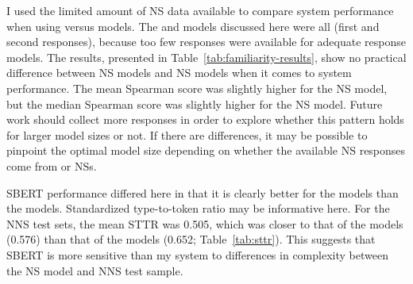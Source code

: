 I used the limited amount of  NS data available to compare system performance when using  versus  models. The  and  models discussed here were all  (first and second responses), because too few  responses were available for adequate  response models. The results, presented in Table~\ref{tab:familiarity-results}, show no practical difference between  NS models and  NS models when it comes to system performance. The mean Spearman score was slightly higher for the  NS model, but the median Spearman score was slightly higher for the  NS model. Future work should collect more  responses in order to explore whether this pattern holds for larger model sizes or not. If there are differences, it may be possible to pinpoint the optimal model size depending on whether the available NS responses come from  or  NSs.

SBERT performance differed here in that it is clearly better for the  models than the  models. Standardized type-to-token ratio may be informative here. For the NNS test sets, the mean STTR was 0.505, which was closer to that of the  models (0.576) than that of the  models (0.652; Table~\ref{tab:sttr}). This suggests that SBERT is more sensitive than my system to differences in complexity between the NS model and NNS test sample.



